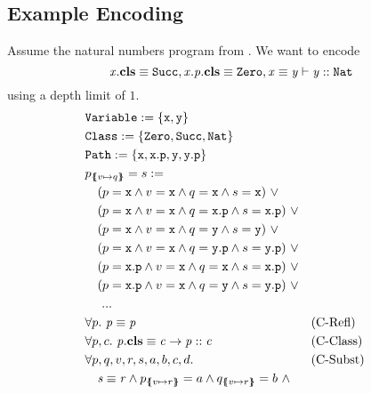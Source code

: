 \documentclass[a4paper]{article}
\begin{document}
\subsection{Example Encoding}
Assume the natural numbers program from .
We want to encode
\[ \mathit{x}.\textbf{cls} \equiv \mathit{\mathtt{Succ}}, \mathit{x.p}.\textbf{cls} \equiv \mathit{\mathtt{Zero}}, \mathit{x} \equiv \mathit{y} \vdash \mathit{y} :: \mathit{\mathtt{Nat}} \]
using a depth limit of $1$.
\begin{align}
  &\texttt{\Variable} := \{\mathtt{x}, \mathtt{y}\}\\
  &\texttt{\Class} := \{\Zero,\Succ,\Nat\}\\
  &\texttt{\Path} := \{\mathtt{x}, \mathtt{x}.\mathtt{p}, \mathtt{y}, \mathtt{y}.\mathtt{p}\}\\
  &\subst{p}{v}{q} = s :=\\
  &\quad (p=\mathtt{x} \land v=\mathtt{x} \land q=\mathtt{x} \land s=\mathtt{x})~\lor\\
  &\quad (p=\mathtt{x} \land v=\mathtt{x} \land q=\mathtt{x.p} \land s=\mathtt{x.p})~\lor\\
  &\quad (p=\mathtt{x} \land v=\mathtt{x} \land q=\mathtt{y} \land s=\mathtt{y})~\lor\\
  &\quad (p=\mathtt{x} \land v=\mathtt{x} \land q=\mathtt{y.p} \land s=\mathtt{y.p})~\lor\\
  &\quad (p=\mathtt{x.p} \land v=\mathtt{x} \land q=\mathtt{x} \land s=\mathtt{x.p})~\lor\\
  &\quad (p=\mathtt{x.p} \land v=\mathtt{x} \land q=\mathtt{y} \land s=\mathtt{y.p})~\lor\\
  &\quad~...\\
  &\forall p.~\pathEq{p}{p} && \text{(C-Refl)}\\
  &\forall p, c.~\instBy{p}{c} \rightarrow \instOf{p}{c} && \text{(C-Class)}\\
  &\forall p, q, v, r, s, a, b, c, d. && \text{(C-Subst)}\\
  &\quad \pathEq{s}{r} \land \subst{p}{v}{r}=a \land \subst{q}{v}{r}=b~\land\\

\end{align}
\end{document}
